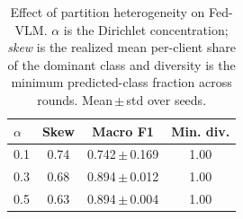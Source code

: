 \begin{table}[t]
\caption{Effect of partition heterogeneity on Fed-VLM. $\alpha$ is the
Dirichlet concentration; \emph{skew} is the realized mean per-client share of
the dominant class and diversity is the minimum predicted-class fraction
across rounds. Mean\,$\pm$\,std over seeds.}
\label{tab:alpha}
\centering\footnotesize
\setlength\tabcolsep{5pt}
\begin{tabular}{lccc}
\toprule
$\alpha$ & Skew & Macro F1 & Min. div.\\
\midrule
0.1 & 0.74 & 0.742\,$\pm$\,0.169 & 1.00 \\
0.3 & 0.68 & 0.894\,$\pm$\,0.012 & 1.00 \\
0.5 & 0.63 & 0.894\,$\pm$\,0.004 & 1.00 \\
\bottomrule
\end{tabular}
\end{table}
